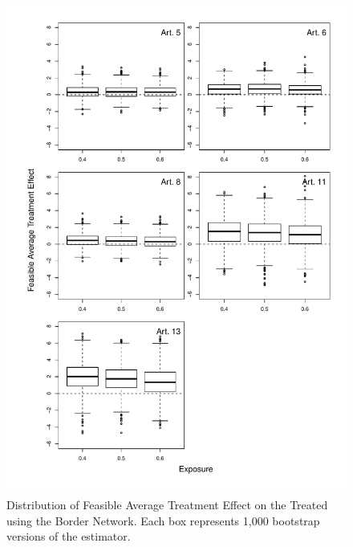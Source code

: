 \documentclass[10pt]{article}
\begin{document}
\begin{figure}[H]
	\centering
	\includegraphics[width=.8\linewidth]{../fig/matching_bloxplot_border.pdf}
	\caption{Distribution of Feasible Average Treatment Effect on the Treated using the Border Network. Each box represents 1,000 bootstrap versions of the estimator.}
\end{figure}
	
\end{document}

